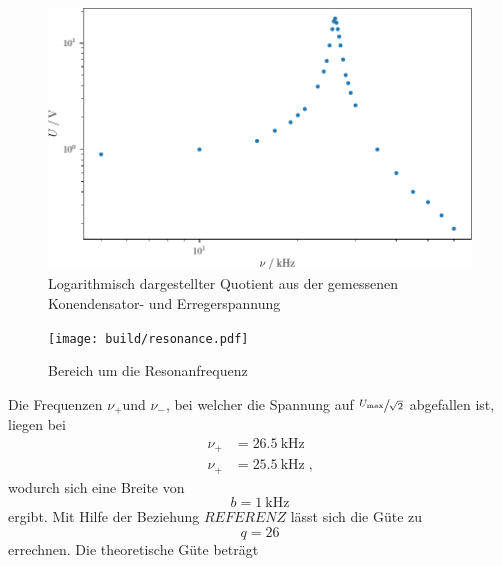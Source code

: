 \begin{figure}
    \centering
    \caption{Logarithmisch dargestellter Quotient aus der gemessenen Konendensator- und Erregerspannung}
    \label{fig:frequence}
    \includegraphics{build/frequence.pdf}
\end{figure}
\begin{figure}
    \centering
    \caption{Bereich um die Resonanfrequenz}
    \label{fig:resonance}
    \texttt{[image: build/resonance.pdf]}
\end{figure}
\noindent Die Frequenzen $\nu_+ $und $\nu_-$, bei welcher die Spannung auf $\sfrac{U_\text{max}}{\sqrt{2}}$ abgefallen ist, liegen bei
\begin{align*}
    \nu_+ &= \SI{26.5}{\kilo\hertz} \\
    \nu_+ &= \SI{25.5}{\kilo\hertz} \; \text{,}
\end{align*}
wodurch sich eine Breite von
\begin{equation*}
    b = \SI{1}{\kilo\hertz}
\end{equation*}
ergibt.
Mit Hilfe der Beziehung $REFERENZ$ lässt sich die Güte zu 
\begin{equation*}
    q = 26
\end{equation*}
errechnen.
Die theoretische Güte beträgt 